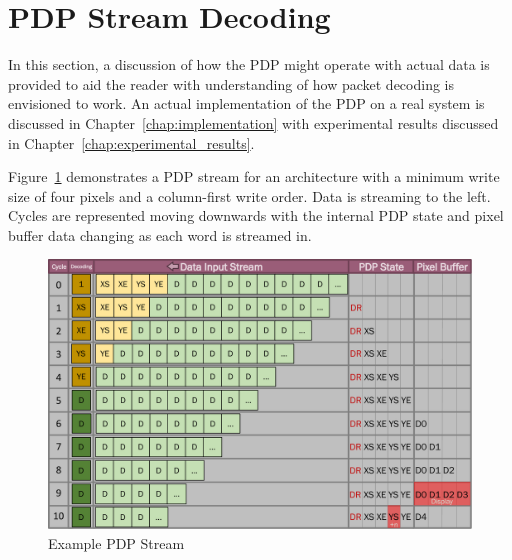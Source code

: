 \section{PDP Stream Decoding}
    \label{sec:pdp_stream_decoding}
    In this section, a discussion of how the PDP might operate with actual data is provided to aid the reader with understanding of how packet decoding is envisioned to work. An actual implementation of the PDP on a real system is discussed in Chapter~\ref{chap:implementation} with experimental results discussed in Chapter~\ref{chap:experimental_results}.

    Figure~\ref{fig:pdp_stream} demonstrates a PDP stream for an architecture with a minimum write size of four pixels and a column-first write order. Data is streaming to the left. Cycles are represented moving downwards with the internal PDP state and pixel buffer data changing as each word is streamed in.

    \begin{figure}
        \centering
        \includegraphics[width=1.0\textwidth]{fig/pdp_stream.pdf}
        \caption{Example PDP Stream}
        \label{fig:pdp_stream}
    \end{figure}

